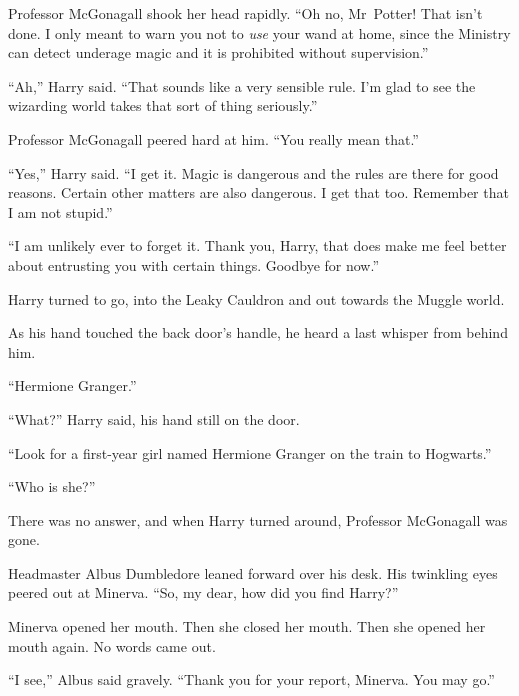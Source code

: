Professor McGonagall shook her head rapidly. “Oh no, Mr~Potter! That isn’t done. I only meant to warn you not to \emph{use} your wand at home, since the Ministry can detect underage magic and it is prohibited without supervision.”

“Ah,” Harry said. “That sounds like a very sensible rule. I’m glad to see the wizarding world takes that sort of thing seriously.”

Professor McGonagall peered hard at him. “You really mean that.”

“Yes,” Harry said. “I get it. Magic is dangerous and the rules are there for good reasons. Certain other matters are also dangerous. I get that too. Remember that I am not stupid.”

“I am unlikely ever to forget it. Thank you, Harry, that does make me feel better about entrusting you with certain things. Goodbye for now.”

Harry turned to go, into the Leaky Cauldron and out towards the Muggle world.

As his hand touched the back door’s handle, he heard a last whisper from behind him.

“Hermione Granger.”

“What?” Harry said, his hand still on the door.

“Look for a first-year girl named Hermione Granger on the train to Hogwarts.”

“Who is she?”

There was no answer, and when Harry turned around, Professor McGonagall was gone.


Headmaster Albus Dumbledore leaned forward over his desk. His twinkling eyes peered out at Minerva. “So, my dear, how did you find Harry?”

Minerva opened her mouth. Then she closed her mouth. Then she opened her mouth again. No words came out.

“I see,” Albus said gravely. “Thank you for your report, Minerva. You may go.”

